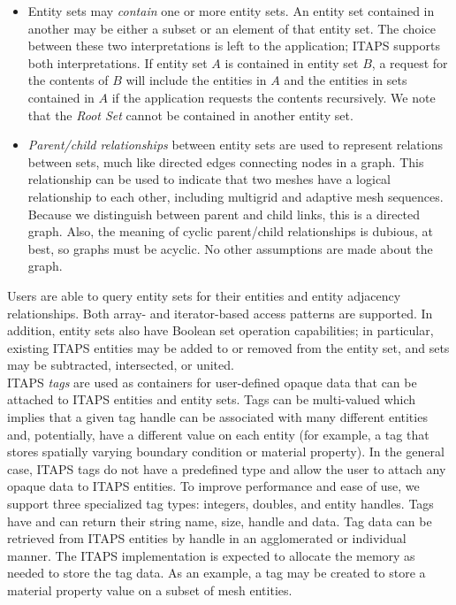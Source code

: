 \documentclass{article}
\begin{document}
\begin{itemize}
\item Entity sets may \textit{contain} one or more entity sets. An entity 
set contained in another may be either a subset or an element 
of that entity set. The choice between these two interpretations 
is left to the application; ITAPS supports both interpretations. 
If entity set $A$ is contained in entity set $B$, a request for the 
contents of $B$ will include the entities in $A$ and the entities 
in sets contained in $A$ if the application requests the contents 
recursively. We note that the \textit{Root Set} cannot be contained 
in another entity set.

\item \textit{Parent/child relationships} between entity sets are used to 
represent relations between sets, much like directed edges connecting 
nodes in a graph. This relationship can be used to indicate that 
two meshes have a logical relationship to each other, including 
multigrid and adaptive mesh sequences. Because we distinguish 
between parent and child links, this is a directed graph. Also, 
the meaning of cyclic parent/child relationships is dubious, 
at best, so graphs must be acyclic. No other assumptions are 
made about the graph.
\end{itemize}

Users are able to query entity sets for their entities and entity 
adjacency relationships. Both array- and iterator-based access 
patterns are supported. In addition, entity sets also have Boolean 
set operation capabilities; in particular, existing ITAPS entities 
may be added to or removed from the entity set, and sets may 
be subtracted, intersected, or united. \\

ITAPS \textit{tags} are used as containers for user-defined opaque 
data that can be attached to ITAPS entities and entity sets. Tags 
can be multi-valued which implies that a given tag handle can 
be associated with many different entities and, potentially, 
have a different value on each entity (for example, a tag that 
stores spatially varying boundary condition or material property). 
In the general case, ITAPS tags do not have a predefined type 
and allow the user to attach any opaque data to ITAPS entities. 
 To improve performance and ease of use, we support three specialized 
tag types: integers, doubles, and entity handles. Tags have and 
can return their string name, size, handle and data. Tag data 
can be retrieved from ITAPS entities by handle in an agglomerated 
or individual manner. The ITAPS implementation is expected to 
allocate the memory as needed to store the tag data. As an example, 
a tag may be created to store a material property value on a 
subset of mesh entities. \\
\end{document}
